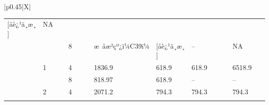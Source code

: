 \documentclass[UTF8,10pt,a4paper,fontset=fandol]{ctexart}
\newcommand{\fieldvalue}[1]{#1}
\newcommand{\handwritten}[1]{#1}
\begin{document}
\begin{tabularx}{\textwidth}{|p{0.45\textwidth}|X|}
{\begin{tabularx}{\linewidth}{|p{0.12\linewidth}|p{0.10\linewidth}|p{0.10\linewidth}|X|X|p{0.16\linewidth}|p{0.14\linewidth}|}
\fieldvalue{\handwritten{[å­è¿¹ä¸æ¸]}} &
NA \\
\cline{2-7}
&  &
\fieldvalue{\handwritten{8}} &
\fieldvalue{\handwritten{æ åæ²çº¿ï¼C39ï¼}} &
\fieldvalue{\handwritten{[å­è¿¹ä¸æ¸]}} &
-- & NA \\
\cline{2-7}
& 1 &
\fieldvalue{\handwritten{4}} &
\fieldvalue{\handwritten{1836.9}} &
\fieldvalue{\handwritten{618.9}} &
\fieldvalue{\handwritten{618.9}} &
\fieldvalue{\handwritten{6518.9}} \\
\cline{2-7}
&  &
\fieldvalue{\handwritten{8}} &
\fieldvalue{\handwritten{818.97}} &
\fieldvalue{\handwritten{618.9}} &
-- & -- \\
\cline{2-7}
& 2 &
\fieldvalue{\handwritten{4}} &
\fieldvalue{\handwritten{2071.2}} &
\fieldvalue{\handwritten{794.3}} &
\fieldvalue{\handwritten{794.3}} &
\fieldvalue{\handwritten{794.3}} \\
\cline{2-7}
&  &

\end{tabularx}}
\end{tabularx}
\end{document}
